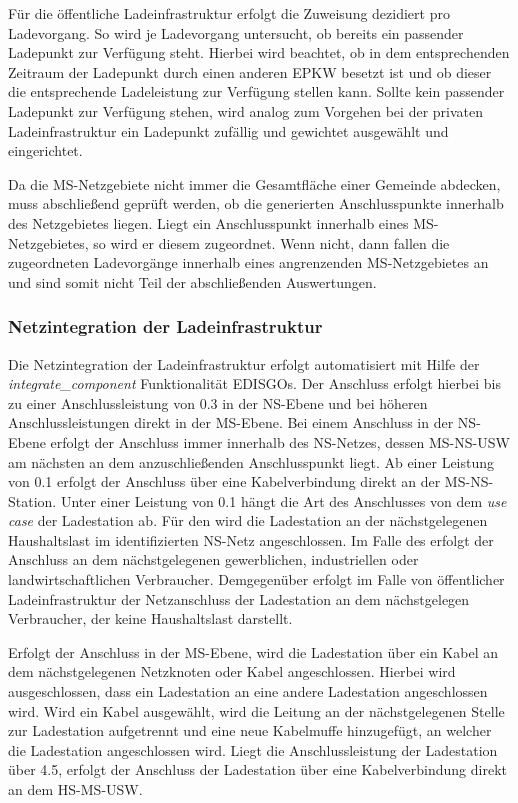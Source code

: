 Für die öffentliche Ladeinfrastruktur erfolgt die Zuweisung dezidiert pro Ladevorgang.
So wird je Ladevorgang untersucht, ob bereits ein passender Ladepunkt zur Verfügung steht.
Hierbei wird beachtet, ob in dem entsprechenden Zeitraum der Ladepunkt durch einen anderen \gls{EPKW} besetzt ist und ob dieser die entsprechende Ladeleistung zur Verfügung stellen kann.
Sollte kein passender Ladepunkt zur Verfügung stehen, wird analog zum Vorgehen bei der privaten Ladeinfrastruktur ein Ladepunkt zufällig und gewichtet ausgewählt und eingerichtet.\medskip

Da die \gls{MS}-Netzgebiete nicht immer die Gesamtfläche einer Gemeinde abdecken, muss abschließend geprüft werden, ob die generierten Anschlusspunkte innerhalb des Netzgebietes liegen.
Liegt ein Anschlusspunkt innerhalb eines \gls{MS}-Netzgebietes, so wird er diesem zugeordnet.
Wenn nicht, dann fallen die zugeordneten Ladevorgänge innerhalb eines angrenzenden \gls{MS}-Netzgebietes an und sind somit nicht Teil der abschließenden Auswertungen.


\subsubsection{Netzintegration der Ladeinfrastruktur}

Die Netzintegration der Ladeinfrastruktur erfolgt automatisiert mit Hilfe der \textit{integrate\_component} Funktionalität \glspl{EDISGO}.
Der Anschluss erfolgt hierbei bis zu einer Anschlussleistung von \SI{0.3}{\mva} in der \gls{NS}-Ebene und bei höheren Anschlussleistungen direkt in der \gls{MS}-Ebene.
Bei einem Anschluss in der \gls{NS}-Ebene erfolgt der Anschluss immer innerhalb des \gls{NS}-Netzes, dessen \gls{MS}-\gls{NS}-\gls{USW} am nächsten an dem anzuschließenden Anschlusspunkt liegt.
Ab einer Leistung von \SI{0.1}{\mva} erfolgt der Anschluss über eine Kabelverbindung direkt an der \gls{MS}-\gls{NS}-Station.
Unter einer Leistung von \SI{0.1}{\mva} hängt die Art des Anschlusses von dem \textit{use case} der Ladestation ab.
Für den \UC \zH wird die Ladestation an der nächstgelegenen Haushaltslast im identifizierten \gls{NS}-Netz angeschlossen.
Im Falle des \UC \Firmeparkplatz erfolgt der Anschluss an dem nächstgelegenen gewerblichen, industriellen oder landwirtschaftlichen Verbraucher.
Demgegenüber erfolgt im Falle von öffentlicher Ladeinfrastruktur der Netzanschluss der Ladestation an dem nächstgelegen Verbraucher, der keine Haushaltslast darstellt.\medskip

Erfolgt der Anschluss in der \gls{MS}-Ebene, wird die Ladestation über ein Kabel an dem nächstgelegenen Netzknoten oder Kabel angeschlossen.
Hierbei wird ausgeschlossen, dass ein Ladestation an eine andere Ladestation angeschlossen wird.
Wird ein Kabel ausgewählt, wird die Leitung an der nächstgelegenen Stelle zur Ladestation aufgetrennt und eine neue Kabelmuffe hinzugefügt, an welcher die Ladestation angeschlossen wird.
Liegt die Anschlussleistung der Ladestation über \SI{4.5}{\mva}, erfolgt der Anschluss der Ladestation über eine Kabelverbindung direkt an dem \gls{HS}-\gls{MS}-\gls{USW}.\medskip

